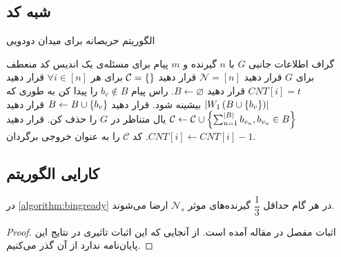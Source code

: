 \subsection{شبه کد}
\begin{algorithm}[H]
    \caption[
        الگوریتم حریصانه برای میدان دودویی
    ]{
        الگوریتم حریصانه برای میدان دودویی
        \cite{pliable2016}
    }
    \label{algorithm:bingready}
    \begin{algorithmic}[1]
        \Require
        گراف اطلاعات جانبی
        $G$
        با
        $n$
        گیرنده و
        $m$
        پیام برای مسئله‌ی
        \Ensure
        یک اندیس کد منعطف برای
        $G$
        \State
        قرار دهید
        $\mathcal{N} = [n]$
        \State
        قرار دهید
        $\mathcal{C} = \left\{  \right\}$
        \State
        برای هر
        $\forall i \in [n]$
        قرار دهید
        $CNT[i] = t$
            \State قرار دهید
            $B \leftarrow \varnothing$.
                \State
                راس پیام
                $b_v \notin B$
                را پیدا کن به طوری که
                $\left|{W_1\left(B \cup\left\{ b_v \right\}\right)}\right|$
                بیشینه شود.
                \State قرار دهید
                $B \leftarrow B \cup\left\{ b_v \right\}$
            \EndWhile
            \State قرار دهید
            $\mathcal{C} \leftarrow \mathcal{C} \cup\left\{ \sum_{u=1}^{\left|{B}\right|} b_{v_u}, b_{v_u} \in B \right\}$
                    \State
                    یال متناظر در
                    $G$
                    را حذف کن.
                \EndIf
                \State
                قرار دهید
                $CNT[i] \leftarrow CNT[i]-1$.
            \EndFor
        \EndWhile
        \State کد
        $\mathcal{C}$
        را به عنوان خروجی برگردان.
    \end{algorithmic}
\end{algorithm}


\subsection{
    کارایی الگوریتم
}
\begin{lemma}
    \label{lemma:pliable2016:lemma2}
    در
    \autoref{algorithm:bingready}
    در هر گام حداقل
    $\dfrac{1}{3}$
    گیرنده‌های موثر
    $\mathcal{N}_s$
    ارضا می‌شوند.
\end{lemma}
\begin{proof}
    اثبات مفصل در مقاله آمده است. از آنجایی که این اثبات تاثیری در نتایج این پایان‌نامه ندارد از آن گذر می‌کنیم.
\end{proof}

